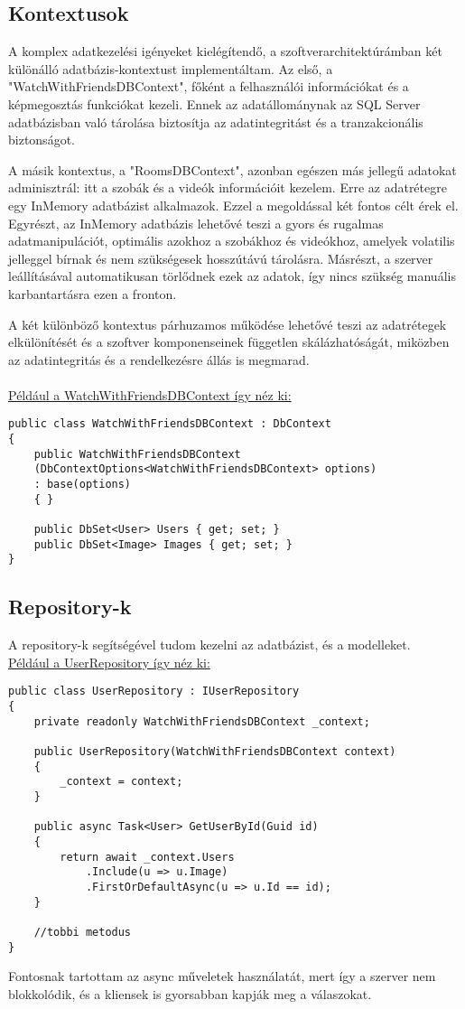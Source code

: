 \subsection*{Kontextusok}
A komplex adatkezelési igényeket kielégítendő, a szoftverarchitektúrámban két különálló adatbázis-kontextust implementáltam. Az első, a "WatchWithFriendsDBContext", főként a felhasználói információkat és a képmegosztás funkciókat kezeli. Ennek az adatállománynak az SQL Server adatbázisban való tárolása biztosítja az adatintegritást és a tranzakcionális biztonságot.

A másik kontextus, a "RoomsDBContext", azonban egészen más jellegű adatokat adminisztrál: itt a szobák és a videók információit kezelem. Erre az adatrétegre egy InMemory adatbázist alkalmazok. Ezzel a megoldással két fontos célt érek el. Egyrészt, az InMemory adatbázis lehetővé teszi a gyors és rugalmas adatmanipulációt, optimális azokhoz a szobákhoz és videókhoz, amelyek volatilis jelleggel bírnak és nem szükségesek hosszútávú tárolásra. Másrészt, a szerver leállításával automatikusan törlődnek ezek az adatok, így nincs szükség manuális karbantartásra ezen a fronton.

A két különböző kontextus párhuzamos működése lehetővé teszi az adatrétegek elkülönítését és a szoftver komponenseinek független skálázhatóságát, miközben az adatintegritás és a rendelkezésre állás is megmarad.
\\
\\
\underline{Például a WatchWithFriendsDBContext így néz ki:}
\begin{lstlisting}[language=CSharp,style=CSharpBase,caption={WatchWithFriendsDBContext}]
public class WatchWithFriendsDBContext : DbContext
{
    public WatchWithFriendsDBContext
    (DbContextOptions<WatchWithFriendsDBContext> options) 
    : base(options)
    { }

    public DbSet<User> Users { get; set; }
    public DbSet<Image> Images { get; set; }
}
\end{lstlisting}
\vspace{1em}
\subsection*{Repository-k}
A repository-k segítségével tudom kezelni az adatbázist, és a modelleket.
\\
\underline{Például a UserRepository így néz ki:}
\begin{lstlisting}[language=CSharp,style=CSharpBase,caption={User Repository}]
public class UserRepository : IUserRepository
{
    private readonly WatchWithFriendsDBContext _context;

    public UserRepository(WatchWithFriendsDBContext context)
    {
        _context = context;
    }

    public async Task<User> GetUserById(Guid id)
    {
        return await _context.Users
            .Include(u => u.Image)
            .FirstOrDefaultAsync(u => u.Id == id);
    }

    //tobbi metodus
}
\end{lstlisting}
\vspace{1em}
Fontosnak tartottam az async műveletek használatát, mert így a szerver nem blokkolódik, és a kliensek is gyorsabban kapják meg a válaszokat.
